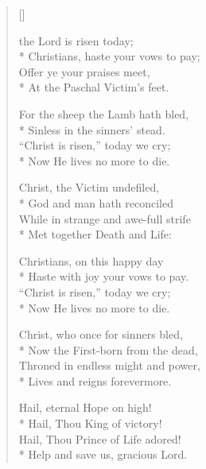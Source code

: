 \newHymn
{}

\begin{verse}[\versewidth]

 the Lord is risen today; \\*
Christians, haste your vows to pay; \\
Offer ye your praises meet, \\*
At the Paschal Victim's feet. 

For the sheep the Lamb hath bled,\\*
Sinless in the sinners' stead. \\
``Christ is risen,'' today we cry;\\*
Now He lives no more to die.

Christ, the Victim undefiled,\\*
God and man hath reconciled\\
While in strange and awe-full strife\\*
Met together Death and Life: 

Christians, on this happy day\\*
Haste with joy your vows to pay. \\
``Christ is risen,'' today we cry; \\*
Now He lives no more to die. 

Christ, who once for sinners bled,\\*
Now the First-born from the dead, \\
Throned in endless might and power, \\*
Lives and reigns forevermore.

Hail, eternal Hope on high!\\*
Hail, Thou King of victory! \\
Hail, Thou Prince of Life adored!\\*
Help and save us, gracious Lord. 

\end{verse}

